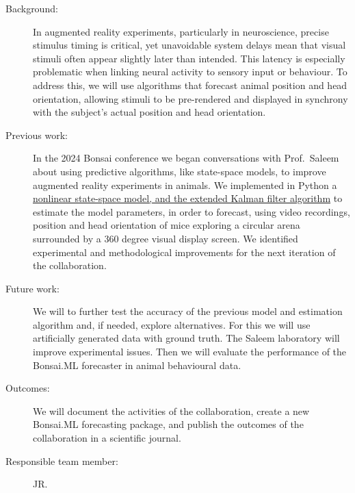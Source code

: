\begin{description}

    \item[Background:] In augmented reality experiments, particularly in
        neuroscience, precise stimulus timing is critical, yet unavoidable
        system delays mean that visual stimuli often appear slightly later than
        intended. This latency is especially problematic when linking neural
        activity to sensory input or behaviour. To address this, we will use
        algorithms that forecast animal position and head orientation, allowing
        stimuli to be pre-rendered and displayed in synchrony with the
        subject's actual position and head orientation.

    \item[Previous work:] In the 2024 Bonsai conference we began conversations
        with Prof.~Saleem about using predictive algorithms, like state-space
        models, to improve augmented reality experiments in animals. We
        implemented in Python a
        \href{https://github.com/joacorapela/collaborationAman/blob/master/reports/ekfForKinematicsAndHeadOrientation/ekfForKinematicsAndHeadOrientation.pdf}{
            nonlinear state-space model, and the extended Kalman filter
            algorithm} to estimate the model parameters, in order to forecast,
        using video recordings, position and head orientation of mice exploring
        a circular arena surrounded by a 360 degree visual display screen. We identified
        experimental and methodological improvements for the next iteration of
        the collaboration.

    \item[Future work:] We will to further test the accuracy of the previous
        model and estimation algorithm and, if needed, explore alternatives. For
        this we will use artificially generated data with ground truth. The
        Saleem laboratory will improve experimental issues. Then we
        will evaluate the performance of the Bonsai.ML forecaster in animal
        behavioural data.

    \item[Outcomes:] We will document the activities of the collaboration, create a new
        Bonsai.ML forecasting package, and publish the outcomes of the
        collaboration in a scientific journal.

    \item[Responsible team member:] JR.

\end{description}


